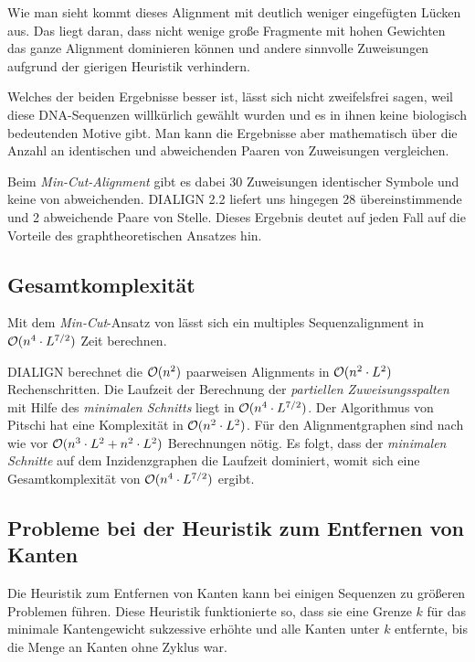 Wie man sieht kommt dieses Alignment mit deutlich weniger eingefügten Lücken aus. Das liegt daran, dass nicht wenige große Fragmente mit hohen Gewichten das ganze Alignment dominieren können und andere sinnvolle Zuweisungen aufgrund der gierigen Heuristik verhindern.

Welches der beiden Ergebnisse besser ist, lässt sich nicht zweifelsfrei sagen, weil diese DNA-Sequenzen willkürlich gewählt wurden und es in ihnen keine biologisch bedeutenden Motive gibt. Man kann die Ergebnisse aber mathematisch über die Anzahl an identischen und abweichenden Paaren von Zuweisungen vergleichen.

Beim \emph{Min-Cut-Alignment} gibt es dabei 30 Zuweisungen identischer Symbole und keine von abweichenden. DIALIGN 2.2 liefert uns hingegen 28 übereinstimmende und 2 abweichende Paare von Stelle. Dieses Ergebnis deutet auf jeden Fall auf die Vorteile des graphtheoretischen Ansatzes hin. 
 
\subsection{Gesamtkomplexität}

\begin{korollar}
	Mit dem \emph{Min-Cut}-Ansatz von \cite{cpm10} lässt sich ein multiples Sequenzalignment in $\mathcal{O}(n^4\cdot L^{7/2})$ Zeit berechnen.
\end{korollar}

\begin{beweis}
	DIALIGN berechnet die $\mathcal{O}(n^2)$ paarweisen Alignments in $\mathcal{O}(n^2\cdot L^2)$ Rechenschritten. Die Laufzeit der Berechnung der \emph{partiellen Zuweisungsspalten} mit Hilfe des \emph{minimalen Schnitts} liegt in $\mathcal{O}(n^4\cdot L^{7/2})$. Der Algorithmus von Pitschi hat eine Komplexität in $\mathcal{O}(n^2\cdot L^2)$. Für den Alignmentgraphen sind nach wie vor $\mathcal{O}(n^3\cdot L^2 + n^2\cdot L^2)$ Berechnungen nötig. Es folgt, dass der \emph{minimalen Schnitte} auf dem Inzidenzgraphen die Laufzeit dominiert, womit sich eine Gesamtkomplexität von $\mathcal{O}(n^4\cdot L^{7/2})$ ergibt.
\end{beweis}

\subsection{Probleme bei der Heuristik zum Entfernen von Kanten}

Die Heuristik zum Entfernen von Kanten kann bei einigen Sequenzen zu größeren Problemen führen. Diese Heuristik funktionierte so, dass sie eine Grenze $k$ für das minimale Kantengewicht sukzessive erhöhte und alle Kanten unter $k$ entfernte, bis die Menge an Kanten ohne Zyklus war. 

